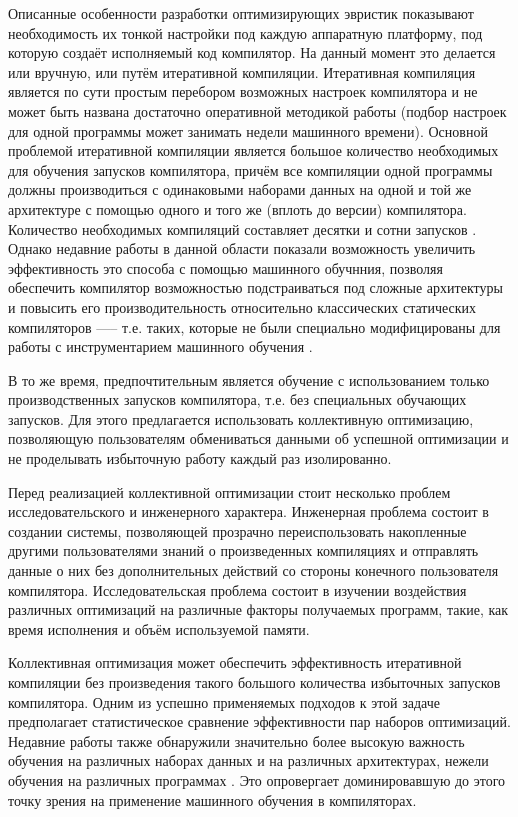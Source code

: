 Описанные особенности разработки оптимизирующих эвристик показывают необходимость их тонкой настройки под каждую аппаратную платформу, под которую создаёт исполняемый код компилятор. На данный момент это делается или вручную, или путём итеративной компиляции. Итеративная компиляция является по сути простым перебором возможных настроек компилятора и не может быть названа достаточно оперативной методикой работы (подбор настроек для одной программы может занимать недели машинного времени). Основной проблемой итеративной компиляции является большое количество необходимых для обучения запусков компилятора, причём все компиляции одной программы должны производиться с одинаковыми наборами данных на одной и той же архитектуре с помощью одного и того же (вплоть до версии) компилятора. Количество необходимых компиляций составляет десятки и сотни запусков \cite{Kisuki:1999:FSI:646347.690219}. Однако недавние работы в данной области показали возможность увеличить эффективность это способа с помощью машинного обучнния, позволяя обеспечить компилятор возможностью подстраиваться под сложные архитектуры и повысить его производительность относительно классических статических компиляторов —-- т.е. таких, которые не были специально модифицированы для работы с инструментарием машинного обучения \cite{Dubach:2009:PCO:1669112.1669124,Dubach:2008:EPA:1450095.1450103}.

В то же время, предпочтительным является обучение с использованием только производственных запусков компилятора, т.е. без специальных обучающих запусков. Для этого предлагается использовать коллективную оптимизацию, позволяющую пользователям обмениваться данными об успешной оптимизации и не проделывать избыточную работу каждый раз изолированно.

Перед реализацией коллективной оптимизации стоит несколько проблем исследовательского и инженерного характера. Инженерная проблема состоит в создании системы, позволяющей прозрачно переиспользовать накопленные другими пользователями знаний о произведенных компиляциях и отправлять данные о них без дополнительных действий со стороны конечного пользователя компилятора. Исследовательская проблема состоит в изучении воздействия различных оптимизаций на различные факторы получаемых программ, такие, как время исполнения и объём используемой памяти.

Коллективная оптимизация может обеспечить эффективность итеративной компиляции без произведения такого большого количества избыточных запусков компилятора. Одним из успешно применяемых подходов к этой задаче предполагает статистическое сравнение эффективности пар наборов оптимизаций. Недавние работы также обнаружили значительно более высокую важность обучения на различных наборах данных и на различных архитектурах, нежели обучения на различных программах \cite{springerlink:10.1007/11596110:24}. Это опровергает доминировавшую до этого точку зрения на применение машинного обучения в компиляторах.

